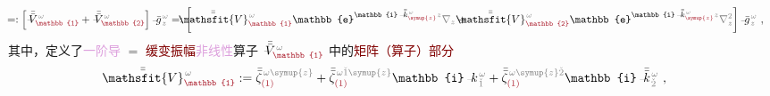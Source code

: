 \begin{subequations}
\begin{align}
	\!\!\! &=: \left[ \Xint{\mathcolor{gray}{-}}{25}{\bar{\bar{V}}}^{\;\! \mathcolor{gray}{\omega}}_{\textcolor{Maroon}{\mathbb{1}}} + \Xint{\mathcolor{gray}{-}}{25}{\bar{\bar{V}}}^{\;\! \mathcolor{gray}{\omega}}_{\textcolor{Maroon}{\mathbb{2}}} \right] \Xint{{}^{}_{\mathcolor{gray}{-}}}{10}{\bar{g}}^{\;\!\mathcolor{gray}{\omega}}_{\;\! \mathcolor{gray}{z}} =: \left[ \Xint{\mathcolor{gray}{-}}{25}{\bar{\bar{\mathsfit{V}}}}^{\;\! \mathcolor{gray}{\omega}}_{\textcolor{Maroon}{\mathbb{1}}} \mathbb{e}^{\mathbb{i} \Xint{\begin{smallmatrix} ~ \\ {}^{}_{\mathcolor{gray}{-}} \\ ~ \end{smallmatrix}}{15}{\bar{\bar{k}}}_{\textcolor{Maroon}{\symup{z}}}^{\;\! \mathcolor{gray}{\omega}} \mathcolor{gray}{z}} \mathcolor{gray}{\nabla_z} + \Xint{\mathcolor{gray}{-}}{25}{\bar{\bar{\mathsfit{V}}}}^{\;\! \mathcolor{gray}{\omega}}_{\textcolor{Maroon}{\mathbb{2}}} \mathbb{e}^{\mathbb{i} \Xint{\begin{smallmatrix} ~ \\ {}^{}_{\mathcolor{gray}{-}} \\ ~ \end{smallmatrix}}{15}{\bar{\bar{k}}}_{\textcolor{Maroon}{\symup{z}}}^{\;\! \mathcolor{gray}{\omega}} \mathcolor{gray}{z}} \mathcolor{gray}{\nabla_z^2} \right] \Xint{{}^{}_{\mathcolor{gray}{-}}}{10}{\bar{g}}^{\;\!\mathcolor{gray}{\omega}}_{\;\! \mathcolor{gray}{z}} ~, \label{eq:matrix_exp_eq-left_V-1st2nd-decompose}
\end{align}
\end{subequations}
其中，定义了\textcolor{Plum}{一阶导} $=$ \textcolor{Maroon}{缓变振幅}\textcolor{Plum}{非线性}算子 $\Xint{\mathcolor{gray}{-}}{21}{\bar{\bar{V}}}^{\;\! \mathcolor{gray}{\omega}}_{\textcolor{Maroon}{\mathbb{1}}}$ 中的\textcolor{Maroon}{矩阵（算子）部分}
\begin{align} \label{eq:matrix_exp-V1}
	\Xint{\mathcolor{gray}{-}}{25}{\bar{\bar{\mathsfit{V}}}}^{\;\! \mathcolor{gray}{\omega}}_{\textcolor{Maroon}{\mathbb{1}}} := \bar{\bar{\zeta}}^{\;\! \mathcolor{gray}{\omega} \mathcolor{gray}{\symup{z}}}_{\textcolor{Maroon}{(1)}} + \bar{\bar{\zeta}}^{\;\! \mathcolor{gray}{\omega} \mathcolor{gray}{\check{1} \symup{z}}}_{\textcolor{Maroon}{(1)}} \mathbb{i} \Xint{\begin{smallmatrix} ~ \\ {}^{}_{\mathcolor{gray}{-}} \\ ~ \end{smallmatrix}}{15}{k}_{\;\! \mathcolor{gray}{\check{1}}}^{\;\! \mathcolor{gray}{\omega}} + \bar{\bar{\zeta}}^{\;\! \mathcolor{gray}{\omega} \mathcolor{gray}{\symup{z} \check{2}}}_{\textcolor{Maroon}{(1)}} \mathbb{i} \Xint{\begin{smallmatrix} ~ \\ {}^{}_{\mathcolor{gray}{-}} \\ ~ \end{smallmatrix}}{15}{\bar{\bar{k}}}_{\;\! \mathcolor{gray}{\check{2}}}^{\;\! \mathcolor{gray}{\omega}} ~, 
\end{align}
